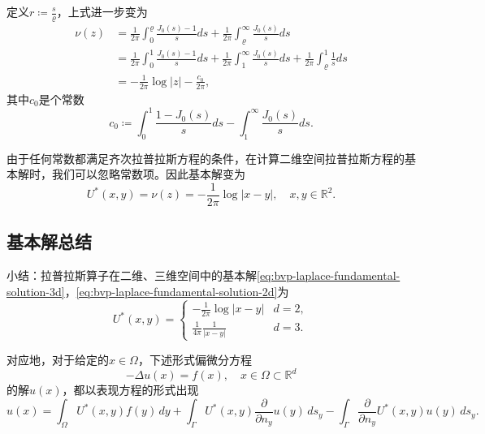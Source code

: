 定义$r \coloneqq \frac{s}{\varrho}$，上式进一步变为
\begin{equation*}
\begin{split}
  \nu(z) & = \frac{1}{2 \pi} \int_{0}^{\varrho}
  \frac{J_0(s) - 1}{s}
  ds
  + \frac{1}{2 \pi}
  \int_{\varrho}^{\infty} \frac{J_0(s)}{s} ds \\
  &= \frac{1}{2 \pi} \int_{0}^{1}
  \frac{J_0(s) - 1}{s}
  ds
  + \frac{1}{2 \pi}
  \int_{1}^{\infty} \frac{J_0(s)}{s} ds
  + \frac{1}{2 \pi}
  \int_{\varrho}^{1}
  \frac{1}{s}
  ds \\
  & = -\frac{1}{2 \pi} \log |z| - \frac{c_0}{2 \pi},
\end{split}
\end{equation*}
其中$c_0$是个常数
\begin{equation*}
  c_0 \coloneqq \int_{0}^{1} \frac{1 - J_0(s)}{s} ds
  - \int_{1}^{\infty} \frac{J_0(s)}{s} ds.
\end{equation*}

由于任何常数都满足齐次拉普拉斯方程的条件，在计算二维空间拉普拉斯方程的基本解时，我们可以忽略常数项。因此基本解变为
\begin{equation}
  \label{eq:bvp-laplace-fundamental-solution-2d}
  U^{*}(x,y) = \nu(z) = -\frac{1}{2 \pi} \log \big| x - y \big|, \quad x,y \in \mathbb{R}^2.
\end{equation}

\subsection{基本解总结}
小结：拉普拉斯算子在二维、三维空间中的基本解\eqref{eq:bvp-laplace-fundamental-solution-3d}，\eqref{eq:bvp-laplace-fundamental-solution-2d}为
\begin{equation}
  \label{eq:bvp-laplace-fundamental-solution-32d}
  U^{*}(x,y) = \begin{cases}
  - \frac{1}{2 \pi} \log | x - y | & d =2, \\
  \frac{1}{4 \pi} \frac{1}{| x - y |} & d = 3.
  \end{cases}
\end{equation}

对应地，对于给定的$x \in \Omega$，下述形式偏微分方程
\begin{equation*}
  - \Delta u(x) = f(x), \quad x \in \Omega \subset \mathbb{R}^d
\end{equation*}
的解$u(x)$，都以表现方程的形式出现
\begin{equation}
  \label{eq:bvp-laplace-representation-formula}
  u(x) = \int_{\Omega} U^{*}(x,y) f(y) \, dy
  + \int_{\Gamma} U^{*}(x,y)  \frac{\partial}{\partial n_y} u(y)  \, d s_y
  - \int_{\Gamma}  \frac{\partial}{\partial n_y} U^{*}(x,y)  u(y) \, d s_y.
\end{equation}
